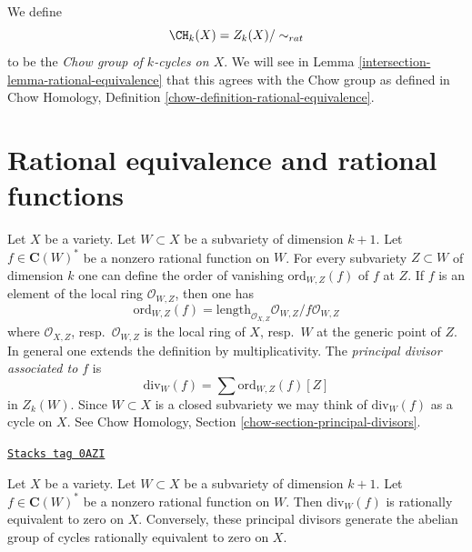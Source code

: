 \medskip\noindent
We define
$$
\CH_k(X) = Z_k(X)/ \sim_{rat}
$$
to be the {\it Chow group of $k$-cycles on $X$}. We will see in
Lemma \ref{intersection-lemma-rational-equivalence}
that this agrees with the Chow group as defined in
Chow Homology, Definition \ref{chow-definition-rational-equivalence}.

\section{Rational equivalence and rational functions}
\label{intersection-section-alternative}
Let $X$ be a variety. Let $W \subset X$ be a subvariety
of dimension $k + 1$. Let $f \in \mathbf{C}(W)^*$ be a nonzero rational
function on $W$. For every subvariety $Z \subset W$ of dimension $k$
one can define the order of vanishing $\text{ord}_{W, Z}(f)$ of $f$ at
$Z$. If $f$ is an element of the local ring $\mathcal{O}_{W, Z}$,
then one has
$$
\text{ord}_{W, Z}(f) =
\text{length}_{\mathcal{O}_{X, Z}} \mathcal{O}_{W, Z}/f\mathcal{O}_{W, Z}
$$
where $\mathcal{O}_{X, Z}$, resp.\ $\mathcal{O}_{W, Z}$ is the
local ring of $X$, resp.\ $W$ at the generic point of $Z$. In general one
extends the definition by multiplicativity. The {\it principal divisor
associated to $f$} is
$$
\text{div}_W(f) = \sum \text{ord}_{W, Z}(f)[Z]
$$
in $Z_k(W)$. Since $W \subset X$ is a closed subvariety we may think
of $\text{div}_W(f)$ as a cycle on $X$.
See Chow Homology, Section \ref{chow-section-principal-divisors}.

\begin{lemma}
\label{intersection-lemma-rational-equivalence}
\href{https://stacks.math.columbia.edu/tag/0AZI}{\texttt{Stacks tag 0AZI}}

Let $X$ be a variety. Let $W \subset X$ be a subvariety
of dimension $k + 1$. Let $f \in \mathbf{C}(W)^*$ be a nonzero rational
function on $W$. Then $\text{div}_W(f)$ is rationally equivalent to zero on
$X$. Conversely, these principal divisors generate the abelian group of
cycles rationally equivalent to zero on $X$.
\end{lemma}

